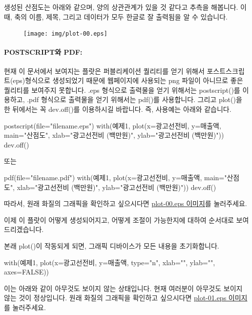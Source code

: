 생성된 산점도는 아래와 같으며, 양의 상관관계가 있을 것 같다고 추측을 해봅니다.
이때, 축의 이름, 제목, 그리고 데이터가 모두 한글로 잘 출력됨을 알 수 있습니다.

\begin{figure}
\begin{center}
\texttt{[image: img/plot-00.eps]}
\end{center}
\end{figure}

\paragraph{POSTSCRIPT와 PDF:} 현재 이 문서에서 보여지는 플랏은 퍼블리케이션 퀄리티를 얻기 위해서 포스트스크립트(eps)형식으로 생성되었기 때문에 웹페이지에 사용되는 png 파일이 아니므로 좋은 퀄리티를 보여주지 못합니다.
.eps 형식으로 출력물을 얻기 위해서는 postscript()를 이용하고, .pdf 형식으로 출력물을 얻기 위해서는 pdf()를 사용합니다. 
그리고 plot()을 한 뒤에서는 꼭 dev.off()를 이용하시길 바랍니다. 
즉, 사용예는 아래와 같습니다. 

\begin{Schunk}
\begin{Soutput}	
postscript(file="filename.eps")
with(예제1, plot(x=광고선전비, y=매출액, main="산점도", xlab="광고선전비 (백만원)", ylab="광고선전비 (백만원)"))
dev.off()

또는 

pdf(file="filename.pdf")
with(예제1, plot(x=광고선전비, y=매출액, main="산점도", xlab="광고선전비 (백만원)", ylab="광고선전비 (백만원)"))
dev.off()
\end{Soutput}
\end{Schunk}


따라서, 원래 화질의 그래픽을 확인하고 싶으시다면 \href{http://korea.gnu.org/gnustats/img/plot-00.eps}{plot-00.eps 이미지}를 눌러주세요. 

이제 이 플랏이 어떻게 생성되어지고, 어떻게 조절이 가능한지에 대하여 순서대로 보여드리겠습니다.

본래 plot()이 작동되게 되면, 그래픽 디바이스가 모든 내용을 초기화합니다. 
\begin{Schunk}
\begin{Soutput}	
with(예제1, plot(x=광고선전비, y=매출액, type="n", xlab="", ylab="", axes=FALSE))
\end{Soutput}
\end{Schunk}

이는 아래와 같이 아무것도 보이지 않는 상태입니다. 
현재 여러분이 아무것도 보이지 않는 것이 정상입니다. 
원래 화질의 그래픽을 확인하고 싶으시다면 \href{http://korea.gnu.org/gnustats/img/plot-01.eps}{plot-01.eps 이미지}를 눌러주세요. 

